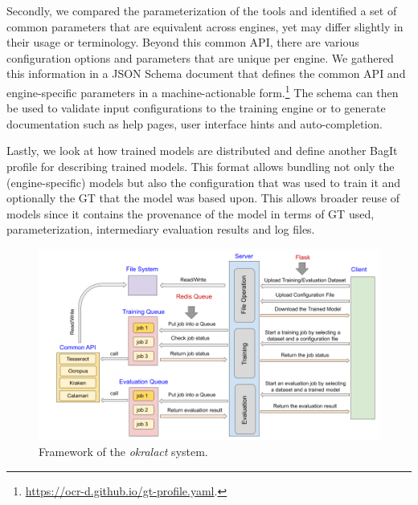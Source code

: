 \documentclass[conference]{IEEEtran}
\begin{document}
Secondly, we compared the parameterization of the tools and
identified a set of common parameters that are equivalent across
engines, yet may differ slightly in their usage or terminology. Beyond
this common API, there are various configuration options and
parameters that are unique per engine. We gathered this information
in a JSON Schema document that defines the common API and
engine-specific parameters in a machine-actionable
form.\footnote{\url{https://ocr-d.github.io/gt-profile.yaml}.} 
The schema can then be used to validate input configurations to the
training engine or to generate documentation such as help pages, user
interface hints and auto-completion.

Lastly, we look at how trained models are distributed and
define another BagIt profile for describing trained models. This
format allows bundling not only the (engine-specific) models but
also the configuration that was used to train it and optionally the
GT that the model was based upon. 
This allows broader reuse of models
since it contains the provenance of the model in terms of GT used,
parameterization, intermediary evaluation results and log files.


\begin{figure}[ht!]
    \begin{center}
        \includegraphics[width=1\linewidth]{Figures/Framework.png}
    \end{center}
    \caption{Framework of the \textit{okralact} system.}
    \label{fig:framework}
\end{figure}
\end{document}
